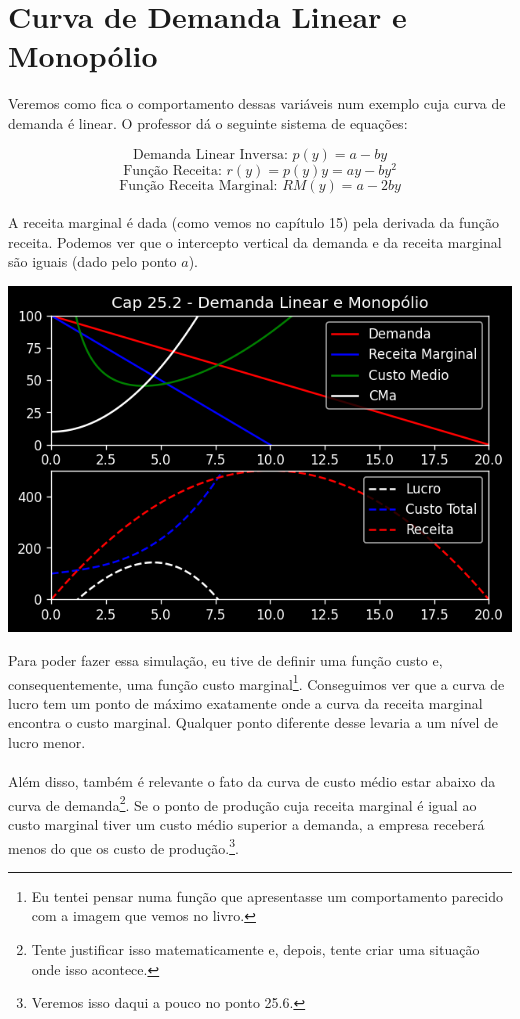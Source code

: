 \documentclass[a4paper,11pt,oneside]{book}
\theoremstyle{definition}
\theoremstyle{break}
\begin{document}
\section{Curva de Demanda Linear e Monopólio}

Veremos como fica o comportamento dessas variáveis num exemplo cuja curva de demanda é linear. O professor dá o seguinte sistema de equações:

$$ \textrm{Demanda Linear Inversa: } p(y) = a - by $$
$$ \textrm{Função Receita: } r(y) = p(y)y = ay - by^2 $$
$$ \textrm{Função Receita Marginal: } RM(y) = a - 2by $$
\\
A receita marginal é dada (como vemos no capítulo 15) pela derivada da função receita. Podemos ver que o intercepto vertical da demanda e da receita marginal são iguais (dado pelo ponto $a$).

\begin{center}
\includegraphics[scale=0.8]{cap25_2-demanda_linear_e_monopolio.png}
\end{center}

Para poder fazer essa simulação, eu tive de definir uma função custo e, consequentemente, uma função custo marginal\footnote{Eu tentei pensar numa função que apresentasse um comportamento parecido com a imagem que vemos no livro.}. Conseguimos ver que a curva de lucro tem um ponto de máximo exatamente onde a curva da receita marginal encontra o custo marginal. Qualquer ponto diferente desse levaria a um nível de lucro menor.
\\
\\
Além disso, também é relevante o fato da curva de custo médio estar abaixo da curva de demanda\footnote{Tente justificar isso matematicamente e, depois, tente criar uma situação onde isso acontece.}. Se o ponto de produção cuja receita marginal é igual ao custo marginal tiver um custo médio superior a demanda, a empresa receberá menos do que os custo de produção.\footnote{Veremos isso daqui a pouco no ponto 25.6.}.
\end{document}
